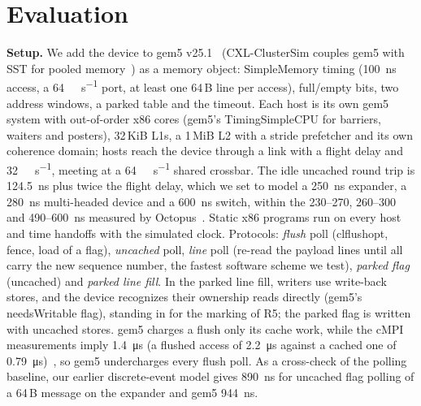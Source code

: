 \documentclass[journal]{IEEEtran}
\begin{document}
\section{Evaluation}
\label{sec:eval}
\textbf{Setup.} We add the device to gem5 v25.1~\cite{gem5} (CXL-ClusterSim couples gem5 with SST for
pooled memory~\cite{cxlclustersim}) as a memory object: SimpleMemory timing
(\SI{100}{\nano\second} access, a \SI{64}{\gibi\byte\per\second} port, at least one 64\,B line per
access), full/empty bits, two address windows, a parked table and the timeout. Each host is its own
gem5 system with out-of-order x86 cores (gem5's TimingSimpleCPU for barriers, waiters and
posters), 32\,KiB L1s, a 1\,MiB L2 with a stride prefetcher and its own coherence domain; hosts reach
the device through a link with a flight delay and \SI{32}{\giga\byte\per\second}, meeting at a
\SI{64}{\giga\byte\per\second} shared crossbar. The idle uncached round trip is
\SI{124.5}{\nano\second} plus twice the flight delay, which we set to model a
\SI{250}{\nano\second} expander, a \SI{280}{\nano\second} multi-headed device and a
\SI{600}{\nano\second} switch, within the 230--270, 260--300 and 490--\SI{600}{\nano\second}
measured by Octopus~\cite{octopus}. Static x86 programs run on every host and time handoffs with
the simulated clock. Protocols: \emph{flush} poll (clflushopt, fence, load of a flag),
\emph{uncached} poll, \emph{line} poll (re-read the payload lines until all carry the new sequence
number, the fastest software scheme we test), \emph{parked flag} (uncached) and \emph{parked line
fill}. In the parked line fill, writers use write-back stores, and the device recognizes their
ownership reads directly (gem5's needsWritable flag), standing in for the marking of R5; the parked
flag is written with uncached stores. gem5 charges a flush only its cache work, while the cMPI
measurements imply \SI{1.4}{\micro\second} (a flushed access of \SI{2.2}{\micro\second}
against a cached one of \SI{0.79}{\micro\second})~\cite{cmpi}, so gem5 undercharges every flush poll. As
a cross-check of the polling baseline, our earlier discrete-event model gives
\SI{890}{\nano\second} for uncached flag polling of a 64\,B message on the expander and gem5
\SI{944}{\nano\second}.
\end{document}
